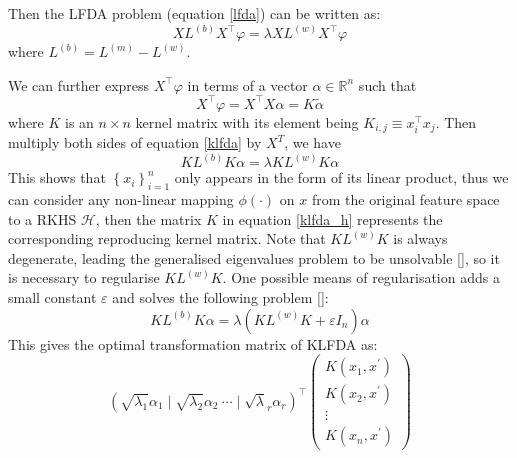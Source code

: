 \documentclass[a4paper,12pt]{article}
\begin{document}
Then the LFDA problem (equation \ref{lfda}) can be written as:
\begin{equation} \label{klfda}
X {L}^{(b)} X^{\top} {\varphi}={\lambda} X {L}^{(w)} X^{\top} {\varphi}
\end{equation}
where ${L}^{(b)}={L}^{(m)}-{L}^{(w)}$. 

We can further express $X^{\top} {\varphi}$ in terms of a vector ${\alpha} \in \mathbb{R}^{n}$ such that
\begin{equation*}
X^{\top} {\varphi}=X^{\top} X {\alpha}=K \widetilde{\alpha}
\end{equation*}
where $K$ is an $n \times n$ kernel matrix with its element being $K_{i, j} \equiv x_{i}^{\top} x_{j}$. Then multiply both sides of equation \ref{klfda} by $X^{T}$, we have 
\begin{equation} \label{klfda_h}
K {L}^{(b)} K {\alpha}={\lambda} K {L}^{(w)} K {\alpha}
\end{equation}
This shows that $\left\{x_{i}\right\}_{i=1}^{n}$ only appears in the form of its linear product, thus we can consider any non-linear mapping $\phi(\cdot)$ on $x$ from the original feature space to a RKHS $\mathcal{H}$, then the matrix $K$ in equation \ref{klfda_h} represents the corresponding reproducing kernel matrix. Note that $K {L}^{(w)} K$ is always degenerate, leading the generalised eigenvalues problem to be unsolvable [\cite{sugiyama2007dimensionality}], so it is necessary to regularise $K {L}^{(w)} K$. One possible means of regularisation adds a small constant $\varepsilon$ and solves the following problem [\cite{friedman1989regularized}]:
\begin{equation*}
K {L}^{(b)} K {\alpha}={\lambda}\left(K {L}^{(w)} K+\varepsilon I_{n}\right) {\alpha}
\end{equation*}
This gives the optimal transformation matrix of KLFDA as:
 \begin{equation*}
\left(\sqrt{{\lambda}_{1}} {\alpha}_{1}\mid\sqrt{{\lambda}_{2}} {\alpha}_{2}\ \cdots \mid \sqrt{{\lambda}}_{r} {\alpha}_{r}\right)^{\top}\left(\begin{array}{c}
K\left(x_{1}, x^{\prime}\right) \\
K\left(x_{2}, x^{\prime}\right) \\
\vdots \\
K\left(x_{n}, x^{\prime}\right)
\end{array}\right)
\end{equation*}
%
%
%
%
%
%
%
\end{document}
